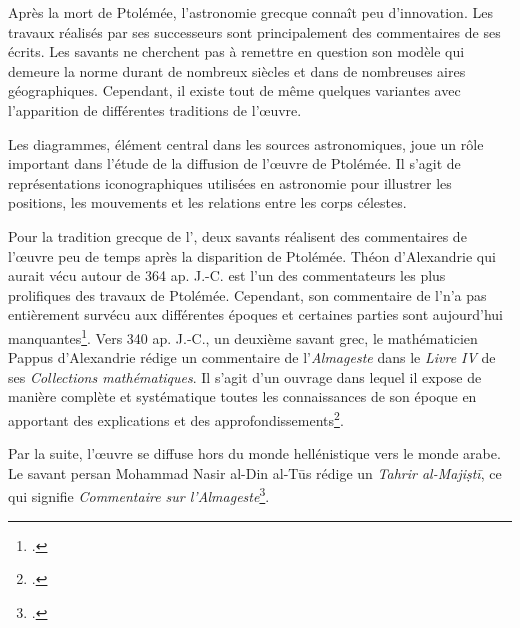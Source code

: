 Après la mort de Ptolémée, l'astronomie grecque connaît peu d'innovation. Les travaux réalisés par ses successeurs sont principalement des commentaires de ses écrits. Les savants ne cherchent pas à remettre en question son modèle qui demeure la norme durant de nombreux siècles et dans de nombreuses aires géographiques. Cependant, il existe tout de même quelques variantes avec l'apparition de différentes traditions de l'œuvre.

Les diagrammes, élément central dans les sources astronomiques, joue un rôle important dans l'étude de la diffusion de l'œuvre de Ptolémée. Il s'agit de représentations iconographiques utilisées en astronomie pour illustrer les positions, les mouvements et les relations entre les corps célestes.

Pour la tradition grecque de l'\almageste, deux savants réalisent des commentaires de l'œuvre peu de temps après la disparition de Ptolémée.
Théon d'Alexandrie qui aurait vécu autour de 364 ap. J.-C. est l'un des commentateurs les plus prolifiques des travaux de Ptolémée. Cependant, son commentaire de l'\almageste n'a pas entièrement survécu aux différentes époques et certaines parties sont aujourd'hui manquantes\footcite{tihonLivreRetrouveCommentaire1987}. Vers 340 ap. J.-C., un deuxième savant grec, le mathématicien Pappus d'Alexandrie rédige un commentaire de l'\textit{Almageste} dans le \textit{Livre IV} de ses \textit{Collections mathématiques}. Il s'agit d'un ouvrage dans lequel il expose de manière complète et systématique toutes les connaissances de son époque en apportant des explications et des approfondissements\footcite{meyerPAPPUS1999}. 

Par la suite, l'œuvre se diffuse hors du monde hellénistique vers le monde arabe. Le savant persan Mohammad Nasir al-Din al-Tūs rédige un \textit{Tahrir al-Majiṣtī}, ce qui signifie \textit{Commentaire sur l'Almageste}\footcite{universalisMOHAMMADNASIRALDIN2008}. 


